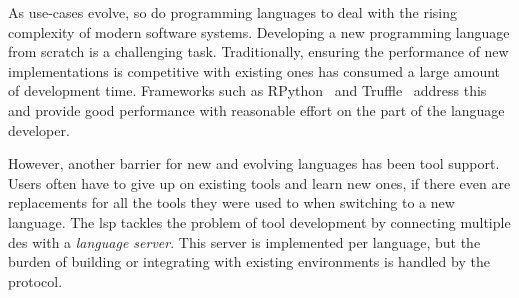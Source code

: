 \documentclass[sigplan,10pt,review,anonymous]{acmart}
\begin{document}

As use-cases evolve, so do programming languages to deal with the rising
complexity of modern software systems. Developing a new programming language
from scratch is a challenging task. Traditionally, ensuring the performance
of new implementations is competitive with existing ones has consumed a large
amount of development time. Frameworks such as RPython~\cite{ancona2007rpython}
and Truffle~\cite{wimmer2012truffle} address this and provide good performance
with reasonable effort on the part of the language developer.

However, another barrier for new and evolving languages has been tool
support. Users often have to give up on existing tools and learn new ones, if
there even are replacements for all the tools they were used to when switching
to a new language. The \ac{lsp} tackles the problem of tool development by
connecting multiple \acp{de} with a \emph{language server}. This server is
implemented per language, but the burden of building or integrating with
existing environments is handled by the protocol.
\end{document}
